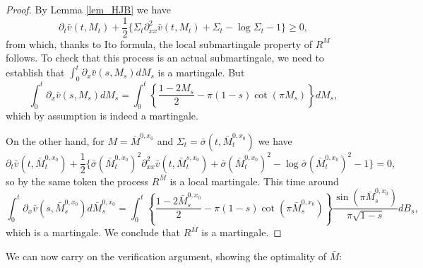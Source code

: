 \documentclass[reqno, a4paper]{amsart}
\theoremstyle{remark}
\newcommand{\1}{\mathbbm 1}
\numberwithin{equation}{section}
\numberwithin{theorem}{section}
\newcommand{\mo}{\bar{M}}
\newcommand{\vo}{\bar{v}}
\newcommand{\so}{\bar{\sigma}}
\begin{document}
\begin{proof}
	By Lemma \ref{lem_HJB} we have
	\[\partial_t \vo(t,M_t)+ \frac{1}{2} \{\Sigma_t \partial^2_{xx}\vo(t,M_t)+\Sigma_t -\log\Sigma_t-1\} \geq 0,\]
	from which, thanks to Ito formula, the local submartingale property of $R^M$ follows. To check that this process is an actual submartingale, we need to establish that 
	 $\int_0^t \partial_x\vo(s,M_s)dM_s$ is a martingale. But
	 \[\int_0^t \partial_x\vo(s,M_s)dM_s=\int_0^t\left\{\frac{1-2M_s}{2}-\pi(1-s)\cot(\pi M_s)  \right\}dM_s,\]
	 which by assumption is indeed a martingale.
	 
	On the other hand, for $M=\mo^{0,x_0}$ and $\Sigma_t=\so(t,\mo^{0,x_0}_t)$ we have 
	\[\partial_t \vo(t,\mo^{0,x_0}_t)+ \frac{1}{2} \{\so(\mo^{0,x_0}_t)^2 \partial^2_{xx}\vo(t,\mo^{s,x_0}_t)+\so(\mo^{0,x_0}_t)^2 -\log\so(\mo^{0,x_0}_t)^2-1\} = 0,\]
	so by the same token the process $R^{\mo}$ is a local martingale.
	This time around
	 \[\int_0^t \partial_x\vo(s,\mo^{0,x_0}_s)d\mo^{0,x_0}_s=\int_0^t\left\{\frac{1-2\mo^{0,x_0}_s}{2}-\pi(1-s)\cot(\pi \mo^{0,x_0}_s)  \right\}\frac{\sin(\pi \mo^{0,x_0}_s)}{\pi\sqrt{1-s}}dB_s,\]
	 which is a martingale. We conclude that $R^{\mo}$ is a martingale.
\end{proof}

We can now carry on the verification argument, showing the optimality of $\mo$:
\end{document}
